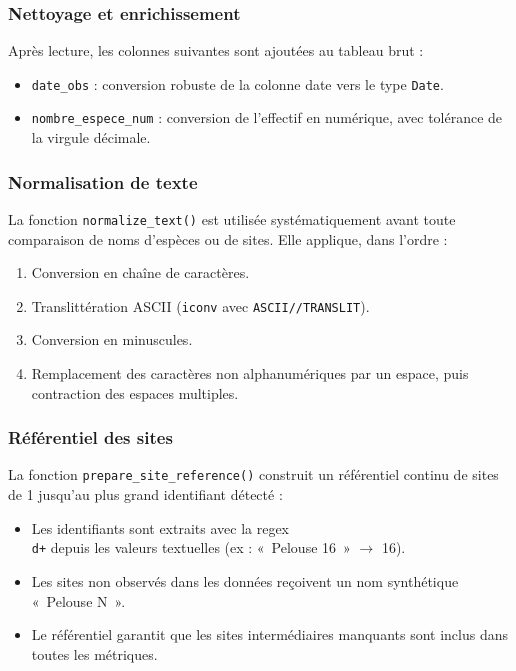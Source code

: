 \documentclass[11pt,a4paper]{article}
\begin{document}
\subsubsection{Nettoyage et enrichissement}

Après lecture, les colonnes suivantes sont ajoutées au tableau brut :

\begin{itemize}
  \item \texttt{date\_obs} : conversion robuste de la colonne date vers le type \texttt{Date}.
  \item \texttt{nombre\_espece\_num} : conversion de l'effectif en numérique, avec tolérance de la virgule décimale.
\end{itemize}

\subsubsection{Normalisation de texte}

La fonction \texttt{normalize\_text()} est utilisée systématiquement avant toute comparaison de noms d'espèces ou de sites. Elle applique, dans l'ordre :

\begin{enumerate}[label=\arabic*.]
  \item Conversion en chaîne de caractères.
  \item Translittération ASCII (\texttt{iconv} avec \texttt{ASCII//TRANSLIT}).
  \item Conversion en minuscules.
  \item Remplacement des caractères non alphanumériques par un espace, puis contraction des espaces multiples.
\end{enumerate}

\subsubsection{Référentiel des sites}

La fonction \texttt{prepare\_site\_reference()} construit un référentiel continu de sites de 1 jusqu'au plus grand identifiant détecté :

\begin{itemize}
  \item Les identifiants sont extraits avec la regex \texttt{\\d+} depuis les valeurs textuelles (ex : «~Pelouse 16~» $\to$ 16).
  \item Les sites non observés dans les données reçoivent un nom synthétique «~Pelouse N~».
  \item Le référentiel garantit que les sites intermédiaires manquants sont inclus dans toutes les métriques.
\end{itemize}
\end{document}
